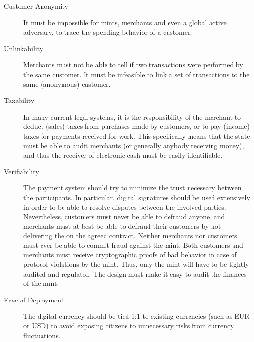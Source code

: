\documentclass{llncs}
\begin{document}
\begin{description}
  \item[Customer Anonymity] It must be impossible for mints, merchants
    and even a global active adversary, to trace the spending behavior
    of a customer.
  \item[Unlinkability] Merchants must not be able to tell if two
    transactions were performed by the same customer.  It must be
    infeasible to link a set of transactions to the same (anonymous)
    customer. %
  \item[Taxability] In many current legal systems, it is the
    responsibility of the merchant to deduct (sales) taxes from
    purchases made by customers, or to pay (income) taxes for payments
    received for work.
    This specifically means that the state must be able to audit merchants (or
    generally anybody receiving money), and thus the receiver of
    electronic cash must be easily identifiable.
  \item[Verifiability] The payment system should try to minimize the
    trust necessary between the participants.  In particular, digital
    signatures should be used extensively in order to be able to
    resolve disputes between the involved parties.  Nevertheless,
    customers must never be able to defraud anyone, and merchants must
    at best be able to defraud their customers by not delivering the
    on the agreed contract.  Neither merchants nor customers must ever
    be able to commit fraud against the mint.  Both customers and
    merchants must receive cryptographic proofs of bad behavior in
    case of protocol violations by the mint.  Thus, only the mint will
    have to be tightly audited and regulated.  The design must make it
    easy to audit the finances of the mint.
  \item[Ease of Deployment] %
    The digital currency should be
    tied 1:1 to existing currencies (such as EUR or USD) to avoid
    exposing citizens to unnecessary risks from currency fluctuations.

\end{description}
\end{document}

